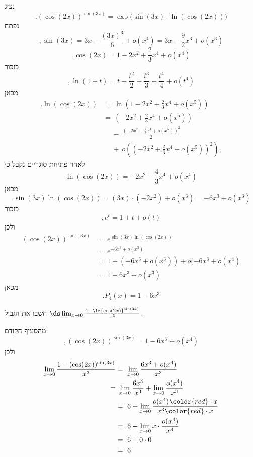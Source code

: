 \begin{solbox}
נציג
\[
.(\cos(2x))^{\sin(3x)}=\exp\bigl(\sin(3x)\cdot\ln(\cos(2x))\bigr)
\]
נפתח
\[
,\sin(3x)=3x-\frac{(3x)^3}{6}+o(x^4)=3x-\frac{9}{2}x^3+o(x^3)
\]
\[
.\cos(2x)=1-2x^2+\frac{2}{3}x^4+o(x^4)
\]
כזכור
$$,\ln(1+t)=t-\frac{t^2}{2}+\frac{t^3}{3}-\frac{t^4}{4}+o(t^4)$$
מכאן
\begin{align*}
.\ln(\cos(2x))&=\ \ln\!\left(1-2x^2+\frac{2}{3}x^4+o(x^5)\right)\\
&=\ \left(-2x^2+\frac{2}{3}x^4+o(x^5)\right)\\
&\quad\ -\ \frac{\left(-2x^2+\frac{2}{3}x^4+o(x^5)\right)^2}{2}\\
&\quad\ +\ o\left(\left(-2x^2+\frac{2}{3}x^4+o(x^5)\right)^2\right),
\end{align*}
לאחר פתיחת סוגריים נקבל כי
$$\ln(\cos(2x))=-2x^2-\frac{4}{3}x^4+o(x^4)$$
מכאן
\[
.\sin(3x)\ln(\cos(2x))=(3x)\cdot(-2x^2)+o(x^3)=-6x^3+o(x^3)
\]
כזכור
$$,e^t=1+t+o(t)$$
ולכן
\begin{align*}
(\cos(2x))^{\sin(3x)}&=\ e^{\sin(3x)\ln(\cos(2x))}\\
&=\ e^{-6x^3+o(x^3)}\\
&=\ 1+(-6x^3+o(x^3))+o(-6x^3+o(x^4)\\
&=\ 1-6x^3+o(x^3)
\end{align*}
מכאן
\[
.P_4(x)=1-6x^3
\]
\end{solbox}
 \item חשבו את הגבול $\ds \lim_{x\to 0}\frac{1-\lr{\cos(2x)}^{\sin (3x)}}{x^3}$.
\begin{solbox}
מהסעיף הקודם:
\[
,(\cos(2x))^{\sin(3x)}=1-6x^3+o(x^4)
\]
ולכן
\begin{align*}
    \lim_{x\to0}\frac{1-(\cos(2x))^{\sin(3x)}}{x^3}&
=\ \lim_{x\to0}\frac{6x^3+o(x^4)}{x^3}\\
=&\ \lim_{x\to0}\frac{6x^3}{x^3}+\lim_{x\to0}\frac{o(x^4)}{x^3}\\
&=\ 6+\lim_{x\to0}\frac{o(x^4){\color{red}\cdot x}}{x^3{\color{red}\cdot x}}\\
&=\ 6+\lim_{x\to0}x\cdot\frac{o(x^4)}{x^4}\\
&=\ 6+0\cdot0\\
&=\ 6.
\end{align*}
\end{solbox}
\eE
